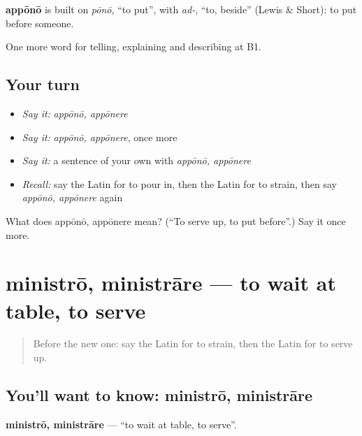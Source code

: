 \begin{cousinweb}
\textbf{appōnō} is built on \emph{pōnō}, \textquotedblleft{}to put\textquotedblright{}, with \emph{ad-}, \textquotedblleft{}to, beside\textquotedblright{} (Lewis \& Short): to put before someone.
\end{cousinweb}

\begin{grammarlens}[title={What you've built}]
One more word for telling, explaining and describing at B1.
\end{grammarlens}

\subsection*{Your turn}
\begin{itemize}
\raggedright
  \item \emph{Say it:} \emph{appōnō, appōnere}
  \item \emph{Say it:} \emph{appōnō, appōnere}, once more
  \item \emph{Say it:} a sentence of your own with \emph{appōnō, appōnere}
  \item \emph{Recall:} say the Latin for to pour in, then the Latin for to strain, then say \emph{appōnō, appōnere} again
\end{itemize}

\begin{tcolorbox}[breakable,colback=teal!4,colframe=teal!35!black,title={Before you move on}]
What does appōnō, appōnere mean? (\textquotedblleft{}To serve up, to put before\textquotedblright{}.) Say it once more.
\end{tcolorbox}
\section[ministrō, ministrāre]{ministrō, ministrāre — to wait at table, to serve}

\label{lesson:LA-C356-ministro}



\begin{quote}
Before the new one: say the Latin for to strain, then the Latin for to serve up.
\end{quote}

\subsection*{You'll want to know: ministrō, ministrāre}
\textbf{ministrō, ministrāre} — \textquotedblleft{}to wait at table, to serve\textquotedblright{}.

